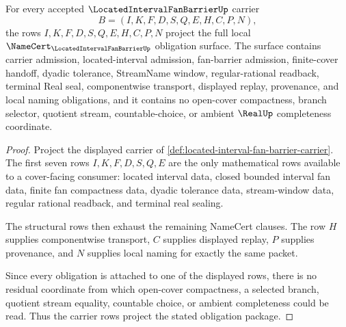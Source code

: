 \begin{theorem}
\label{thm:located-interval-fan-barrier-obligation-package}
For every accepted $\LocatedIntervalFanBarrierUp$ carrier
$$
B=(I,K,F,D,S,Q,E,H,C,P,N),
$$
the rows $I,K,F,D,S,Q,E,H,C,P,N$ project the full local $\NameCert_{\LocatedIntervalFanBarrierUp}$ obligation surface. The surface contains carrier admission, located-interval admission, fan-barrier admission, finite-cover handoff, dyadic tolerance, StreamName window, regular-rational readback, terminal Real seal, componentwise transport, displayed replay, provenance, and local naming obligations, and it contains no open-cover compactness, branch selector, quotient stream, countable-choice, or ambient $\RealUp$ completeness coordinate.
\end{theorem}
\begin{proof}
Project the displayed carrier of \autoref{def:located-interval-fan-barrier-carrier}. The first seven rows $I,K,F,D,S,Q,E$ are the only mathematical rows available to a cover-facing consumer: located interval data, closed bounded interval fan data, finite fan compactness data, dyadic tolerance data, stream-window data, regular rational readback, and terminal real sealing.

The structural rows then exhaust the remaining NameCert clauses. The row $H$ supplies componentwise transport, $C$ supplies displayed replay, $P$ supplies provenance, and $N$ supplies local naming for exactly the same packet.

Since every obligation is attached to one of the displayed rows, there is no residual coordinate from which open-cover compactness, a selected branch, quotient stream equality, countable choice, or ambient completeness could be read. Thus the carrier rows project the stated obligation package.
\end{proof}

